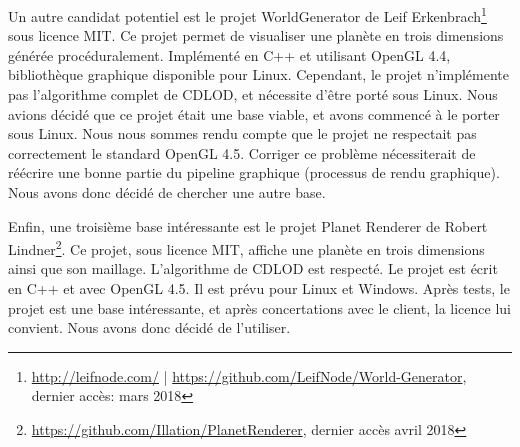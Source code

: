 Un autre candidat potentiel est le projet WorldGenerator de Leif
Erkenbrach\footnote{\url{http://leifnode.com/} |
\url{https://github.com/LeifNode/World-Generator}, dernier accès: mars 2018} sous licence MIT. Ce
projet permet de visualiser une planète en trois dimensions générée
procéduralement. Implémenté en C++ et utilisant OpenGL 4.4, bibliothèque
graphique disponible pour Linux. Cependant, le projet n'implémente pas
l'algorithme complet de CDLOD, et nécessite d'être porté sous Linux.
Nous avions décidé que ce projet était une base viable, et avons
commencé à le porter sous Linux. Nous nous sommes rendu compte que le
projet ne respectait pas correctement le standard OpenGL 4.5. Corriger
ce problème nécessiterait de réécrire une bonne partie du pipeline
graphique (processus de rendu graphique). Nous avons donc décidé de
chercher une autre base.

Enfin, une troisième base intéressante est le projet Planet Renderer de
Robert
Lindner\footnote{\url{https://github.com/Illation/PlanetRenderer}, dernier accès avril 2018}. Ce
projet, sous licence MIT, affiche une planète en trois dimensions ainsi
que son maillage. L'algorithme de CDLOD est respecté. Le projet est
écrit en C++ et avec OpenGL 4.5. Il est prévu pour Linux et Windows.
Après tests, le projet est une base intéressante, et après concertations
avec le client, la licence lui convient. Nous avons donc décidé de
l'utiliser.
